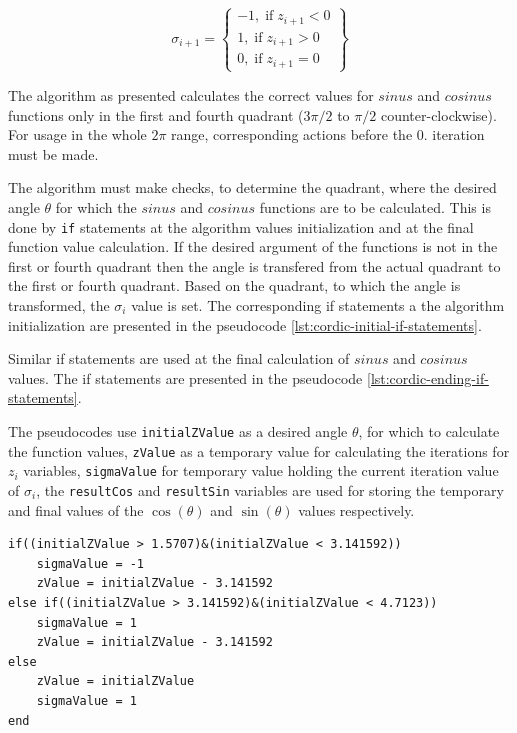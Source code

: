 \documentclass[a4paper, twoside, 11pt]{article}
\begin{document}
            \begin{equation}
                \sigma_{i+1} = 
                \left\{
                \begin{array}{lr}
                    -1,\;\text{if}\;z_{i+1} < 0\\
                    1,\;\text{if}\;z_{i+1} > 0\\
                    0,\;\text{if}\;z_{i+1} = 0
                \end{array}
                \right\}
            \end{equation}
            \par
            The algorithm as presented calculates the correct values for $sinus$ and $cosinus$ functions only in the first and fourth quadrant ($3\pi/2$ to $\pi/2$ counter-clockwise). For usage in the whole $2\pi$ range, corresponding actions before the 0. iteration must be made.\par
            The algorithm must make checks, to determine the quadrant, where the desired angle $\theta$ for which the $sinus$ and $cosinus$ functions are to be calculated. This is done by \texttt{if} statements at the algorithm values initialization and at the final function value calculation. If the desired argument of the functions is not in the first or fourth quadrant then the angle is transfered from the actual quadrant to the first or fourth quadrant. Based on the quadrant, to which the angle is transformed, the $\sigma_i$ value is set. The corresponding if statements a the algorithm initialization are presented in the pseudocode \ref{lst:cordic-initial-if-statements}.\par
            Similar if statements are used at the final calculation of $sinus$ and $cosinus$ values. The if statements are presented in the pseudocode \ref{lst:cordic-ending-if-statements}.\par
            The pseudocodes use \texttt{initialZValue} as a desired angle $\theta$, for which to calculate the function values, \texttt{zValue} as a temporary value for calculating the iterations for $z_{i}$ variables, \texttt{sigmaValue} for temporary value holding the current iteration value of $\sigma_i$, the \texttt{resultCos} and \texttt{resultSin} variables are used for storing the temporary and final values of the $\cos (\theta)$ and $\sin (\theta)$ values respectively.

\begin{lstlisting}[language={pseudocode}, caption={Pseudocode for if statements used at the value initialization of the \gls{abbreviation:cordic} algorithm.}, label= {lst:cordic-initial-if-statements}]
if((initialZValue > 1.5707)&(initialZValue < 3.141592))
    sigmaValue = -1
    zValue = initialZValue - 3.141592
else if((initialZValue > 3.141592)&(initialZValue < 4.7123))
    sigmaValue = 1
    zValue = initialZValue - 3.141592
else
    zValue = initialZValue
    sigmaValue = 1
end
\end{lstlisting}
\end{document}
